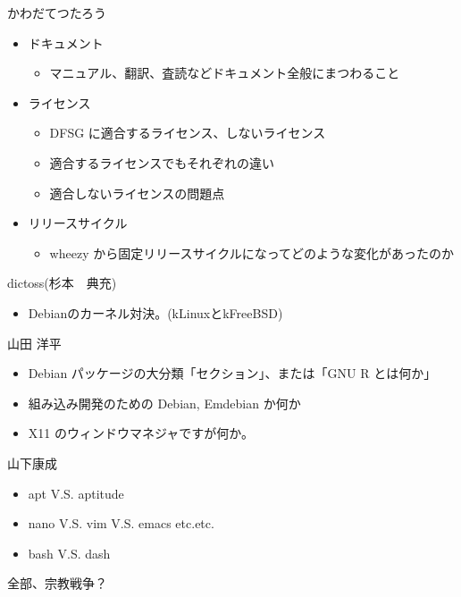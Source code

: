 \documentclass[mingoth,a4paper]{jsarticle}
\begin{document}
\begin{prework}{ かわだてつたろう }
  \begin{itemize}
  \item ドキュメント
    \begin{itemize}
    \item マニュアル、翻訳、査読などドキュメント全般にまつわること
    \end{itemize}
  \item ライセンス
    \begin{itemize}
    \item DFSG に適合するライセンス、しないライセンス
    \item 適合するライセンスでもそれぞれの違い
    \item 適合しないライセンスの問題点
    \end{itemize}
  \item リリースサイクル
    \begin{itemize}
    \item wheezy から固定リリースサイクルになってどのような変化があったのか
    \end{itemize}
  \end{itemize}
\end{prework}

\begin{prework}{ dictoss(杉本　典充) }

 \begin{itemize}
  \item Debianのカーネル対決。(kLinuxとkFreeBSD)
 \end{itemize}

\end{prework}



\begin{prework}{ 山田 洋平 }

 \begin{itemize}
  \item Debian パッケージの大分類「セクション」、または「GNU R とは何か」
  \item 組み込み開発のための Debian, Emdebian か何か
  \item X11 のウィンドウマネジャですが何か。
 \end{itemize}

\end{prework}

\begin{prework}{ 山下康成 }

 \begin{itemize}
  \item apt V.S. aptitude
  \item nano V.S. vim V.S. emacs etc.etc.
  \item bash V.S. dash
 \end{itemize}
全部、宗教戦争？

\end{prework}
\end{document}
